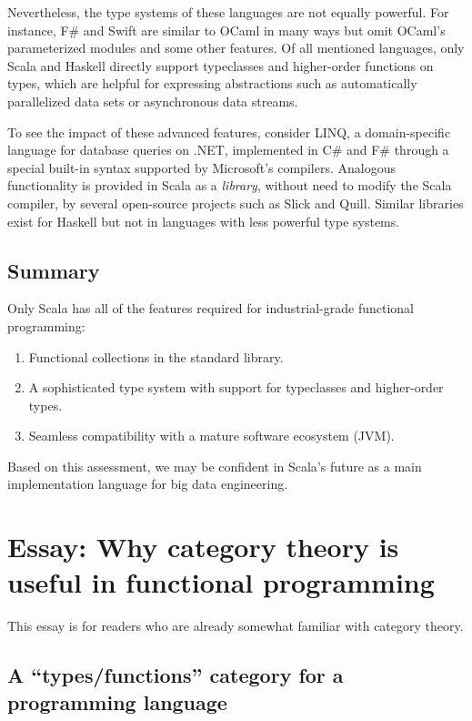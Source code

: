 Nevertheless, the type systems of these languages are not equally
powerful. For instance, F\# and Swift are similar to OCaml in many
ways but omit OCaml\textsf{'}s parameterized modules and some other features.
Of all mentioned languages, only Scala and Haskell directly support
typeclasses and higher-order functions on types, which are helpful
for expressing abstractions such as automatically parallelized data
sets or asynchronous data streams.

To see the impact of these advanced features, consider LINQ, a domain-specific
language for database queries on .NET, implemented in C\# and F\#
through a special built-in syntax supported by Microsoft\textsf{'}s compilers.
Analogous functionality is provided in Scala as a \emph{library},
without need to modify the Scala compiler, by several open-source
projects such as Slick and Quill. Similar libraries exist for Haskell
\textemdash{} but not in languages with less powerful type systems.

\section{Summary}

Only Scala has all of the features required for industrial-grade functional
programming:
\begin{enumerate}
\item Functional collections in the standard library.
\item A sophisticated type system with support for typeclasses and higher-order
types.
\item Seamless compatibility with a mature software ecosystem (JVM).
\end{enumerate}
Based on this assessment, we may be confident in Scala\textsf{'}s future as
a main implementation language for big data engineering.

\chapter{Essay: Why category theory is useful in functional programming}

This essay is for
readers who are already somewhat familiar with category theory.

\section{A \textquotedblleft types/functions\textquotedblright{} category for
a programming language}

